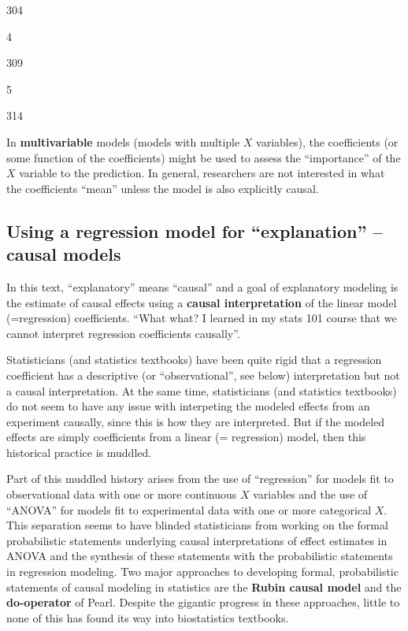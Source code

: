 \documentclass[]{book}
\begin{document}
304

4

309

5

314

In \textbf{multivariable} models (models with multiple \(X\) variables), the coefficients (or some function of the coefficients) might be used to assess the ``importance'' of the \(X\) variable to the prediction. In general, researchers are not interested in what the coefficients ``mean'' unless the model is also explicitly causal.

\hypertarget{using-a-regression-model-for-explanation-causal-models}{%
\subsection{Using a regression model for ``explanation'' -- causal models}\label{using-a-regression-model-for-explanation-causal-models}}

In this text, ``explanatory'' means ``causal'' and a goal of explanatory modeling is the estimate of causal effects using a \textbf{causal interpretation} of the linear model (=regression) coefficients. ``What what? I learned in my stats 101 course that we cannot interpret regression coefficients causally''.

Statisticians (and statistics textbooks) have been quite rigid that a regression coefficient has a descriptive (or ``observational'', see below) interpretation but not a causal interpretation. At the same time, statisticians (and statistics textbooks) do not seem to have any issue with interpeting the modeled effects from an experiment causally, since this is how they are interpreted. But if the modeled effects are simply coefficients from a linear (= regression) model, then this historical practice is muddled.

Part of this muddled history arises from the use of ``regression'' for models fit to observational data with one or more continuous \(X\) variables and the use of ``ANOVA'' for models fit to experimental data with one or more categorical \(X\). This separation seems to have blinded statisticians from working on the formal probabilistic statements underlying causal interpretations of effect estimates in ANOVA and the synthesis of these statements with the probabilistic statements in regression modeling. Two major approaches to developing formal, probabilistic statements of causal modeling in statistics are the \textbf{Rubin causal model} and the \textbf{do-operator} of Pearl. Despite the gigantic progress in these approaches, little to none of this has found its way into biostatistics textbooks.
\end{document}
